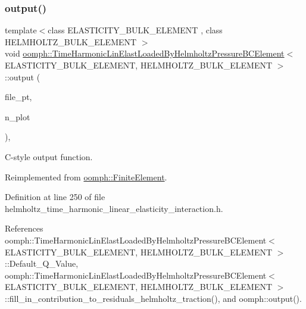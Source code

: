 \subsubsection{\texorpdfstring{output()}{output()}\hspace{0.1cm}{\footnotesize\ttfamily [4/4]}}
{\footnotesize\ttfamily template$<$class E\+L\+A\+S\+T\+I\+C\+I\+T\+Y\+\_\+\+B\+U\+L\+K\+\_\+\+E\+L\+E\+M\+E\+NT , class H\+E\+L\+M\+H\+O\+L\+T\+Z\+\_\+\+B\+U\+L\+K\+\_\+\+E\+L\+E\+M\+E\+NT $>$ \\
void \hyperlink{classoomph_1_1TimeHarmonicLinElastLoadedByHelmholtzPressureBCElement}{oomph\+::\+Time\+Harmonic\+Lin\+Elast\+Loaded\+By\+Helmholtz\+Pressure\+B\+C\+Element}$<$ E\+L\+A\+S\+T\+I\+C\+I\+T\+Y\+\_\+\+B\+U\+L\+K\+\_\+\+E\+L\+E\+M\+E\+NT, H\+E\+L\+M\+H\+O\+L\+T\+Z\+\_\+\+B\+U\+L\+K\+\_\+\+E\+L\+E\+M\+E\+NT $>$\+::output (\begin{DoxyParamCaption}\item[{F\+I\+LE $\ast$}]{file\+\_\+pt,  }\item[{const unsigned \&}]{n\+\_\+plot }\end{DoxyParamCaption})\hspace{0.3cm}{\ttfamily [inline]}, {\ttfamily [virtual]}}



C-\/style output function. 



Reimplemented from \hyperlink{classoomph_1_1FiniteElement_adfaee690bb0608f03320eeb9d110d48c}{oomph\+::\+Finite\+Element}.



Definition at line 250 of file helmholtz\+\_\+time\+\_\+harmonic\+\_\+linear\+\_\+elasticity\+\_\+interaction.\+h.



References oomph\+::\+Time\+Harmonic\+Lin\+Elast\+Loaded\+By\+Helmholtz\+Pressure\+B\+C\+Element$<$ E\+L\+A\+S\+T\+I\+C\+I\+T\+Y\+\_\+\+B\+U\+L\+K\+\_\+\+E\+L\+E\+M\+E\+N\+T, H\+E\+L\+M\+H\+O\+L\+T\+Z\+\_\+\+B\+U\+L\+K\+\_\+\+E\+L\+E\+M\+E\+N\+T $>$\+::\+Default\+\_\+\+Q\+\_\+\+Value, oomph\+::\+Time\+Harmonic\+Lin\+Elast\+Loaded\+By\+Helmholtz\+Pressure\+B\+C\+Element$<$ E\+L\+A\+S\+T\+I\+C\+I\+T\+Y\+\_\+\+B\+U\+L\+K\+\_\+\+E\+L\+E\+M\+E\+N\+T, H\+E\+L\+M\+H\+O\+L\+T\+Z\+\_\+\+B\+U\+L\+K\+\_\+\+E\+L\+E\+M\+E\+N\+T $>$\+::fill\+\_\+in\+\_\+contribution\+\_\+to\+\_\+residuals\+\_\+helmholtz\+\_\+traction(), and oomph\+::output().

\mbox{\label{classoomph_1_1TimeHarmonicLinElastLoadedByHelmholtzPressureBCElement_af8f267ad94739fefd852796732eea1bd}} 
